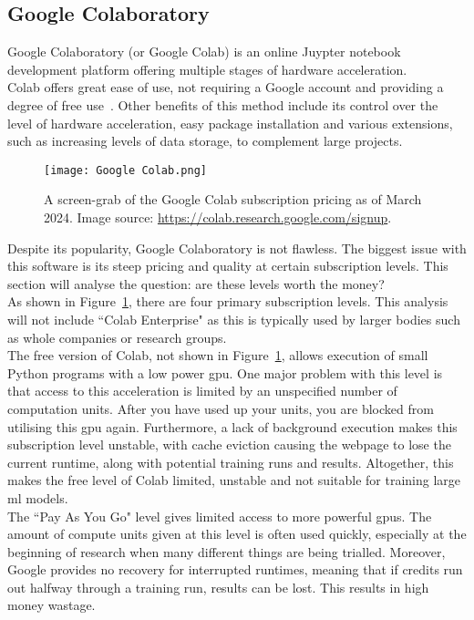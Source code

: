 \subsection{Google Colaboratory}
Google Colaboratory (or Google Colab) is an online Juypter notebook development platform offering multiple stages of hardware acceleration.\\
Colab offers great ease of use, not requiring a Google account and providing a degree of free use~\cite{Google-colaboratory}. Other benefits of this method include its control over the level of hardware acceleration, easy package installation and various extensions, such as increasing levels of data storage, to complement large projects.\\
\begin{figure}
\centering
\texttt{[image: Google Colab.png]}
\caption[A screen-grab of the Google Colab subscription pricing as of March 2024.]{A screen-grab of the Google Colab subscription pricing as of March 2024. Image source: \url{https://colab.research.google.com/signup}.}
\label{fig:Google Colab}
\end{figure}
Despite its popularity, Google Colaboratory is not flawless. The biggest issue with this software is its steep pricing and quality at certain subscription levels. This section will analyse the question: are these levels worth the money?\\
As shown in Figure~\ref{fig:Google Colab}, there are four primary subscription levels. This analysis will not include ``Colab Enterprise" as this is typically used by larger bodies such as whole companies or research groups.\\
The free version of Colab, not shown in Figure~\ref{fig:Google Colab}, allows execution of small Python programs with a low power \acrshort{gpu}. One major problem with this level is that access to this acceleration is limited by an unspecified number of computation units. After you have used up your units, you are blocked from utilising this \acrshort{gpu} again. Furthermore, a lack of background execution makes this subscription level unstable, with cache eviction causing the webpage to lose the current runtime, along with potential training runs and results. Altogether, this makes the free level of Colab limited, unstable and not suitable for training large \acrshort{ml} models.\\
The ``Pay As You Go" level gives limited access to more powerful \acrshort{gpu}s. The amount of compute units given at this level is often used quickly, especially at the beginning of research when many different things are being trialled. Moreover, Google provides no recovery for interrupted runtimes, meaning that if credits run out halfway through a training run, results can be lost. This results in high money wastage.\\
